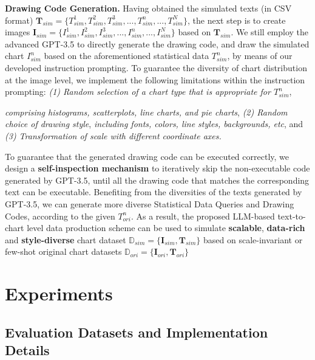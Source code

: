 \documentclass{article} \usepackage{iclr2024_conference,times}
\begin{document}
\noindent\textbf{Drawing Code Generation.}
Having obtained the simulated texts (in CSV format) {\small $\mathbf{T}_{sim}=\{T_{sim}^1,T_{sim}^2,T_{sim}^3,...,T_{sim}^n,...,T_{sim}^N\}$}, the next step is to create images {\small$\mathbf{I}_{sim}= \{I_{sim}^1,I_{sim}^2,I_{sim}^3,...,I_{sim}^n,...,I_{sim}^N\}$} based on {\small $\mathbf{T}_{sim}$}. We still employ the advanced GPT-3.5 to directly generate the drawing code, and draw the simulated chart {\small $I_{sim}^n$ } based on the aforementioned statistical data {\small $T_{sim}^n$}, by means of our developed instruction prompting. To guarantee the diversity of chart distribution at the image level, we implement the following limitations within the instruction prompting: \textit{(1) Random selection of a chart type that is appropriate for {\small $T_{sim}^n$}}, {\textit{comprising histograms, scatterplots, line charts, and pie charts}, \textit{(2) Random choice of drawing style}, \textit{including fonts, colors, line styles, backgrounds, \textit{etc}}, and \textit{(3) Transformation of scale with different coordinate axes.}

To guarantee that the generated drawing code can be executed correctly, we design a \textbf{self-inspection mechanism} to iteratively skip the non-executable code generated by GPT-3.5, until all the drawing code that matches the corresponding text can be executable. Benefiting from the diversities of the texts generated by GPT-3.5, we can generate more diverse Statistical Data Queries and Drawing Codes, according to the given {\small $T_{ori}^n$}. As a result, the proposed LLM-based text-to-chart level data production scheme can be used to simulate \textbf{scalable}, \textbf{data-rich} and \textbf{style-diverse} chart dataset {\small $\mathbb{D}_{sim}=\{\mathbf{I}_{sim},\mathbf{T}_{sim}\}$ } based on scale-invariant or few-shot original chart datasets {\small $\mathbb{D}_{ori}=\{\mathbf{I}_{ori},\mathbf{T}_{ori}\}$ }


\vspace{-8pt}
\section{Experiments}
\vspace{-8pt}
\label{sec:experiment}

\subsection{Evaluation Datasets and Implementation Details}
\label{subsec:datasets}
\vspace{-8pt}

}
\end{document}
